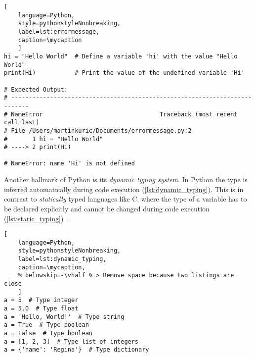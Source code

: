 \def\mycaption{Example of an error message. Since Python is case-sensitive, the
    error is caused by misspelling the variable name \texttt{hi} as \texttt{Hi}.
    The error message begins with the type of error (\texttt{NameError}),
    followed by a traceback that shows the sequence of function calls that led
    to the error. The traceback located the source of the error in the file
    \texttt{errormessage.py} and points to the line that caused the error.
    Finally, the error message explains the error, stating that \texttt{'Hi'} is
    undefined. }
\begin{lstlisting}[
    language=Python, 
    style=pythonstyleNonbreaking,
    label=lst:errormessage,
    caption=\mycaption
    ]
hi = "Hello World"  # Define a variable 'hi' with the value "Hello World"
print(Hi)           # Print the value of the undefined variable 'Hi'

# Expected Output:
# ---------------------------------------------------------------------------
# NameError                                 Traceback (most recent call last)
# File /Users/martinkuric/Documents/errormessage.py:2
#       1 hi = "Hello World"
# ----> 2 print(Hi)

# NameError: name 'Hi' is not defined
\end{lstlisting}



Another hallmark of Python is its \textit{dynamic typing system}. In Python the
type is inferred automatically during code execution
(\autoref{lst:dynamic_typing}). This is in contrast to \textit{statically} typed
languages like C, where the type of a variable has to be declared explicitly and
cannot be changed during code execution
(\autoref{lst:static_typing})~\cite{PythonLanguageReference2024}.

\def\mycaption{ Example of dynamic typing in Python. The variable ``\texttt{a}''
    is assigned the value 5, which is of type integer. The variable
    ``\texttt{a}'' is then overwritten with the value ``\texttt{Hello,
        World!}'', which is of type string. Python allows dynamic re-assignment of
    variables with different types. Note that code after ``\texttt{\#}'' is
    considered a comment and won't be executed.}
\begin{lstlisting}[
    language=Python,
    style=pythonstyleNonbreaking,
    label=lst:dynamic_typing,
    caption=\mycaption,
    % belowskip=-\vhalf % > Remove space because two listings are close
    ]
a = 5  # Type integer
a = 5.0  # Type float
a = 'Hello, World!'  # Type string
a = True  # Type boolean
a = False  # Type boolean
a = [1, 2, 3]  # Type list of integers
a = {'name': 'Regina'}  # Type dictionary
\end{lstlisting}

